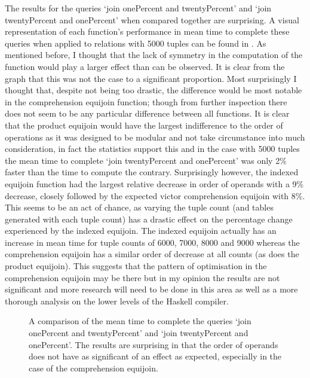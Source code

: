 The results for the queries `join onePercent and twentyPercent' and `join
twentyPercent and onePercent' when compared together are surprising. A visual
representation of each function's performance in mean time to complete these
queries when applied to relations with 5000 tuples can be found in 
. As mentioned before,
I thought that the lack of symmetry in the computation of the function would
play a larger effect than can be observed. It is clear from the graph that this
was not the case to a significant proportion. Most surprisingly I thought that,
despite not being too drastic, the difference would be most notable in the
comprehension equijoin function; though from further inspection there does not
seem to be any particular difference between all functions. It is clear that the
product equijoin would have the largest indifference to the order of operations
as it was designed to be modular and not take circumstance into much
consideration, in fact the statistics support this and in the case with 5000
tuples the mean time to complete `join twentyPercent and onePercent' was only
2\% faster than the time to compute the contrary. Surprisingly however, the
indexed equijoin function had the largest relative decrease in order of operands
with a 9\% decrease, closely followed by the expected victor comprehension
equijoin with 8\%. This seems to be an act of chance, as varying the tuple count
(and tables generated with each tuple count) has a drastic effect on the
percentage change experienced by the indexed equijoin. The indexed equijoin
actually has an increase in mean time for tuple counts of 6000, 7000, 8000 and
9000 whereas the comprehension equijoin has a similar order of decrease at all
counts (as does the product equijoin). This suggests that the pattern of
optimisation in the comprehension equijoin may be there but in my opinion the
results are not significant and more research will need to be done in this area
as well as a more thorough analysis on the lower levels of the Haskell compiler.

\begin{figure}[p]
    
    \caption{A comparison of the mean time to complete the queries `join
    onePercent and twentyPercent' and `join twentyPercent and onePercent'. The
results are surprising in that the order of operands does not have as
significant of an effect as expected, especially in the case of the
comprehension equijoin.}
    \label{fig:benchmark:onePercent-twentyPercent-flipped-5000}
\end{figure}

